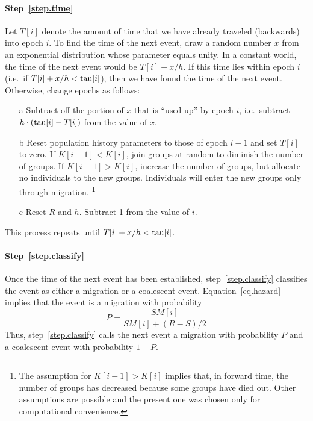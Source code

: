 \paragraph{Step~\ref{step.time}} Let $T[i]$ denote the amount of time
that we have already traveled (backwards) into epoch $i$.  To find the
time of the next event, draw a random number $x$ from an exponential
distribution whose parameter equals unity.  In a constant world, the
time of the next event would be $T[i] + x/h$.  If this time lies within
epoch $i$ (i.e.\ if $T[i] + x/h < \hbox{tau}[i]$), then we have found the time
of the next event.  Otherwise, change epochs as follows:
\begin{enumerate}
  \item[a] Subtract off the portion of $x$ that is ``used up'' by epoch
        $i$, i.e.\ subtract $h\cdot(\hbox{tau}[i] - T[i])$ from the value of
        $x$. 
  \item[b] Reset population history parameters to those of epoch $i-1$
        and set $T[i]$ to zero.  If $K[i-1] < K[i]$, join groups at
        random to diminish the number of groups.  If $K[i-1]>K[i]$,
        increase the number of groups, but allocate no individuals to the
        new groups.  Individuals will enter the new groups only through
        migration.%
\footnote{The assumption for $K[i-1]>K[i]$ implies that, in forward
time, the number of groups has decreased because some groups have died
out.  Other assumptions are possible and the present one was chosen
only for computational convenience.
}
  \item[c] Reset $R$ and $h$.  Subtract 1 from the value of $i$.
\end{enumerate}
This process repeats until $T[i] + x/h < \hbox{tau}[i]$.

\paragraph{Step~\ref{step.classify}}
Once the time of the next event has been established,
step~\ref{step.classify} classifies the event as either a migration or
a coalescent event.  Equation~\ref{eq.hazard} implies that the event is a
migration with probability
\begin{displaymath}
P = \frac{S M[i]}{S M[i] + (R - S)/2}
\end{displaymath}
Thus, step~\ref{step.classify} calls the next event a migration with
probability $P$ and a coalescent event with probability $1-P$.

